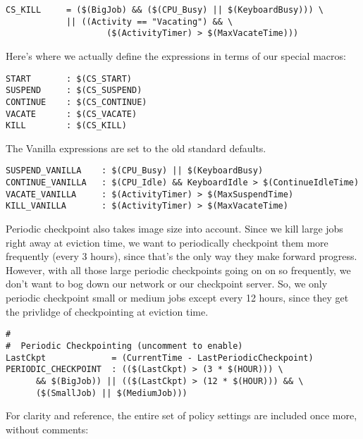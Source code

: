 \begin{verbatim}
CS_KILL     = ($(BigJob) && ($(CPU_Busy) || $(KeyboardBusy))) \
            || ((Activity == "Vacating") && \
                    ($(ActivityTimer) > $(MaxVacateTime))) 
\end{verbatim}

Here's where we actually define the expressions in terms of our
special macros:

\begin{verbatim}
START       : $(CS_START)
SUSPEND     : $(CS_SUSPEND)
CONTINUE    : $(CS_CONTINUE)
VACATE      : $(CS_VACATE)
KILL        : $(CS_KILL)
\end{verbatim}

The Vanilla expressions are set to the old standard defaults.

\begin{verbatim}
SUSPEND_VANILLA    : $(CPU_Busy) || $(KeyboardBusy)
CONTINUE_VANILLA   : $(CPU_Idle) && KeyboardIdle > $(ContinueIdleTime)
VACATE_VANILLA     : $(ActivityTimer) > $(MaxSuspendTime)
KILL_VANILLA       : $(ActivityTimer) > $(MaxVacateTime)
\end{verbatim}

Periodic checkpoint also takes image size into account.  Since we kill
large jobs right away at eviction time, we want to periodically
checkpoint them more frequently (every 3 hours), since that's the only
way they make forward progress.  However, with all those large
periodic checkpoints going on on so frequently, we don't want to bog
down our network or our checkpoint server.  So, we only periodic
checkpoint small or medium jobs except every 12 hours, since they get the
privlidge of checkpointing at eviction time.

\begin{verbatim}
#
#  Periodic Checkpointing (uncomment to enable)
LastCkpt             = (CurrentTime - LastPeriodicCheckpoint)
PERIODIC_CHECKPOINT  : (($(LastCkpt) > (3 * $(HOUR))) \
      && $(BigJob)) || (($(LastCkpt) > (12 * $(HOUR))) && \
      ($(SmallJob) || $(MediumJob)))
\end{verbatim}

For clarity and reference, the entire set of policy settings are
included once more, without comments:

